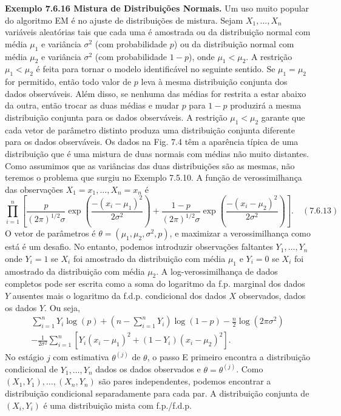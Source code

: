\textbf{Exemplo 7.6.16 Mistura de Distribuições Normais.} Um uso muito popular do algoritmo EM é no ajuste de distribuições de mistura. Sejam $X_1, \dots, X_n$ variáveis aleatórias tais que cada uma é amostrada ou da distribuição normal com média $\mu_1$ e variância $\sigma^2$ (com probabilidade $p$) ou da distribuição normal com média $\mu_2$ e variância $\sigma^2$ (com probabilidade $1-p$), onde $\mu_1 < \mu_2$. A restrição $\mu_1 < \mu_2$ é feita para tornar o modelo identificável no seguinte sentido. Se $\mu_1 = \mu_2$ for permitido, então todo valor de $p$ leva à mesma distribuição conjunta dos dados observáveis. Além disso, se nenhuma das médias for restrita a estar abaixo da outra, então trocar as duas médias e mudar $p$ para $1-p$ produzirá a mesma distribuição conjunta para os dados observáveis. A restrição $\mu_1 < \mu_2$ garante que cada vetor de parâmetro distinto produza uma distribuição conjunta diferente para os dados observáveis. Os dados na Fig. 7.4 têm a aparência típica de uma distribuição que é uma mistura de duas normais com médias não muito distantes. Como assumimos que as variâncias das duas distribuições são as mesmas, não teremos o problema que surgiu no Exemplo 7.5.10.
A função de verossimilhança das observações $X_1=x_1, \dots, X_n=x_n$ é
$$ \prod_{i=1}^{n} \left[ \frac{p}{(2\pi)^{1/2}\sigma}\exp\left(\frac{-(x_i-\mu_1)^2}{2\sigma^2}\right) + \frac{1-p}{(2\pi)^{1/2}\sigma}\exp\left(\frac{-(x_i-\mu_2)^2}{2\sigma^2}\right) \right]. \quad (7.6.13) $$
O vetor de parâmetros é $\theta = (\mu_1, \mu_2, \sigma^2, p)$, e maximizar a verossimilhança como está é um desafio. No entanto, podemos introduzir observações faltantes $Y_1, \dots, Y_n$ onde $Y_i=1$ se $X_i$ foi amostrado da distribuição com média $\mu_1$ e $Y_i=0$ se $X_i$ foi amostrado da distribuição com média $\mu_2$. A log-verossimilhança de dados completos pode ser escrita como a soma do logaritmo da f.p. marginal dos dados $Y$ ausentes mais o logaritmo da f.d.p. condicional dos dados $X$ observados, dados os dados $Y$. Ou seja,
\begin{multline}
\sum_{i=1}^{n} Y_i \log(p) + \left(n - \sum_{i=1}^{n} Y_i\right) \log(1-p) - \frac{n}{2}\log(2\pi\sigma^2) \\
- \frac{1}{2\sigma^2}\sum_{i=1}^{n}\left[Y_i(x_i-\mu_1)^2+(1-Y_i)(x_i-\mu_2)^2\right]. \quad \tag{7.6.14}
\end{multline}
No estágio $j$ com estimativa $\theta^{(j)}$ de $\theta$, o passo E primeiro encontra a distribuição condicional de $Y_1, \dots, Y_n$ dados os dados observados e $\theta=\theta^{(j)}$. Como $(X_1, Y_1), \dots, (X_n, Y_n)$ são pares independentes, podemos encontrar a distribuição condicional separadamente para cada par. A distribuição conjunta de $(X_i, Y_i)$ é uma distribuição mista com f.p./f.d.p.
